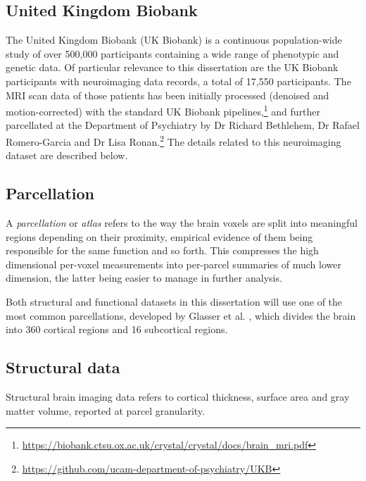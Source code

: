 \subsection{United Kingdom Biobank}

The United Kingdom Biobank (UK Biobank) \cite{sudlow2015uk} is a continuous population-wide study of over 500,000 participants containing a wide range of phenotypic and genetic data. 
Of particular relevance to this dissertation are the UK Biobank participants with neuroimaging data records, a total of 17,550 participants.
The MRI scan data of those patients has been initially processed (denoised and motion-corrected) with the standard UK Biobank pipelines,\footnote{\url{https://biobank.ctsu.ox.ac.uk/crystal/crystal/docs/brain_mri.pdf}} and further parcellated at the Department of Psychiatry by Dr Richard Bethlehem, Dr Rafael Romero-Garcia and Dr Lisa Ronan.\footnote{\url{https://github.com/ucam-department-of-psychiatry/UKB}} The details related to this neuroimaging dataset are described below.

\subsection{Parcellation}
A \textit{parcellation} or \textit{atlas} refers to the way the brain voxels are split into meaningful regions depending on their proximity, empirical evidence of them being responsible for the same function and so forth. This compresses the high dimensional per-voxel measurements into per-parcel summaries of much lower dimension, the latter being easier to manage in further analysis.


Both structural and functional datasets in this dissertation will use one of the most common parcellations, developed by Glasser et al. \cite{glasser2016multi}, which divides the brain into 360 cortical regions and 16 subcortical regions. 

\subsection{Structural data}
Structural brain imaging data refers to cortical thickness, surface area and gray matter volume, reported at parcel granularity.

